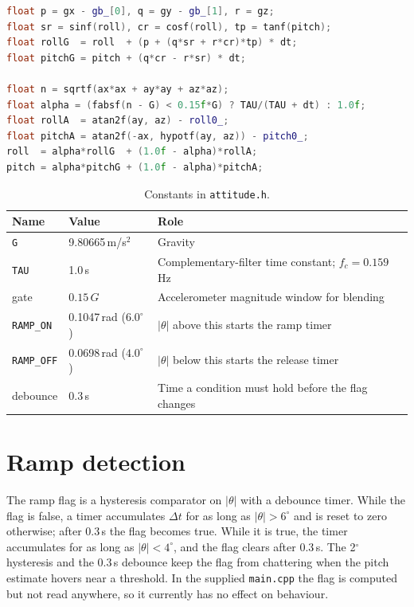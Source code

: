 \documentclass[11pt,a4paper]{report}
\newcommand{\code}[1]{\texttt{#1}}
\begin{document}
\begin{lstlisting}[language=C++,caption={Core of \texttt{Attitude::update()}.},label={lst:attupdate}]
float p = gx - gb_[0], q = gy - gb_[1], r = gz;
float sr = sinf(roll), cr = cosf(roll), tp = tanf(pitch);
float rollG  = roll  + (p + (q*sr + r*cr)*tp) * dt;
float pitchG = pitch + (q*cr - r*sr) * dt;

float n = sqrtf(ax*ax + ay*ay + az*az);
float alpha = (fabsf(n - G) < 0.15f*G) ? TAU/(TAU + dt) : 1.0f;
float rollA  = atan2f(ay, az) - roll0_;
float pitchA = atan2f(-ax, hypotf(ay, az)) - pitch0_;
roll  = alpha*rollG  + (1.0f - alpha)*rollA;
pitch = alpha*pitchG + (1.0f - alpha)*pitchA;
\end{lstlisting}

\begin{table}[H]
\centering
\caption{Constants in \code{attitude.h}.}\label{tab:attconst}
\small
\begin{tabular}{@{}llp{7cm}@{}}
\toprule
Name & Value & Role\\
\midrule
\code{G} & 9.80665\,m/s$^2$ & Gravity\\
\code{TAU} & 1.0\,s & Complementary-filter time constant; $f_c=0.159$\,Hz\\
gate & $0.15\,G$ & Accelerometer magnitude window for blending\\
\code{RAMP\_ON} & 0.1047\,rad ($6.0^\circ$) & $|\theta|$ above this starts the ramp timer\\
\code{RAMP\_OFF} & 0.0698\,rad ($4.0^\circ$) & $|\theta|$ below this starts the release timer\\
debounce & 0.3\,s & Time a condition must hold before the flag changes\\
\bottomrule
\end{tabular}
\end{table}

\section{Ramp detection}
The ramp flag is a hysteresis comparator on $|\theta|$ with a debounce timer. While the flag is false, a timer accumulates $\Delta t$ for as long as $|\theta|>6^\circ$ and is reset to zero otherwise; after 0.3\,s the flag becomes true. While it is true, the timer accumulates for as long as $|\theta|<4^\circ$, and the flag clears after 0.3\,s. The 2$^\circ$ hysteresis and the 0.3\,s debounce keep the flag from chattering when the pitch estimate hovers near a threshold. In the supplied \code{main.cpp} the flag is computed but not read anywhere, so it currently has no effect on behaviour.
\end{document}
